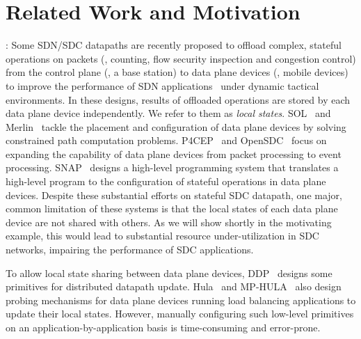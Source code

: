 \section{Related Work and Motivation}
\label{sec:motivation}

: 
Some SDN/SDC datapaths are recently proposed to offload complex,
stateful operations on packets (\eg, counting, flow security inspection and
congestion control) from the control plane (\eg, a base station) to data plane
devices (\eg, mobile devices) to improve the performance of SDN
applications~\cite{arashloo2016snap, heorhiadi2016simplifying, soule2014merlin,
benet2018mp, katta2016hula, gember2012stratos, anwer2015programming,
monsanto2012compiler,
kohler2018p4cep, bianchi2014openstate, opensdc} under dynamic
tactical environments. 
In these designs, results of offloaded operations are
stored by each data plane device independently. We refer to them as
\textit{local states}.
SOL~\cite{heorhiadi2016simplifying} and Merlin~\cite{soule2014merlin}
tackle the placement and configuration of data plane devices by solving
constrained path computation problems.
  P4CEP~\cite{kohler2018p4cep} and OpenSDC~\cite{opensdc} focus on expanding the
capability of data plane devices from packet processing to event processing.
SNAP~\cite{arashloo2016snap} designs a high-level programming system that
translates a high-level program to the configuration of
stateful operations in data plane devices. Despite these substantial efforts
on stateful SDC datapath, one major, common limitation of these systems is that the local states of each data plane device are not
shared with others. As we will show shortly in the motivating example, this would lead to
substantial resource under-utilization in SDC networks, impairing the
performance of SDC applications. 

To allow local state sharing between data plane devices, DDP~\cite{ddp} designs
some  primitives for distributed datapath update. Hula~\cite{katta2016hula} and
MP-HULA~\cite{benet2018mp} also design probing mechanisms for data plane devices
running load balancing applications to update their local states.  However,
manually configuring such low-level primitives on an application-by-application
basis is time-consuming and error-prone.






